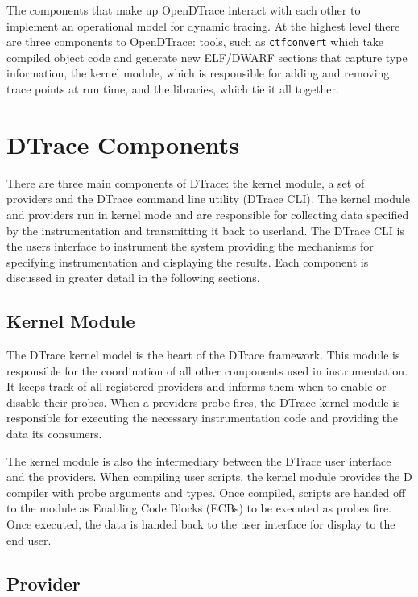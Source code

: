 The components that make up OpenDTrace interact with each other to
implement an operational model for dynamic tracing.  At the highest
level there are three components to OpenDTrace: tools, such as
\texttt{ctfconvert} which take compiled object code and generate new
ELF/DWARF sections that capture type information, the kernel module,
which is responsible for adding and removing trace points at run time,
and the libraries, which tie it all together.

\section{DTrace Components}

There are three main components of DTrace: the kernel module, a set of
providers and the DTrace command line utility (DTrace CLI). The kernel
module and providers run in kernel mode and are responsible for
collecting data specified by the instrumentation and transmitting it
back to userland. The DTrace CLI is the users interface to instrument
the system providing the mechanisms for specifying instrumentation and
displaying the results. Each component is discussed in greater detail
in the following sections.

\subsection{Kernel Module}

The DTrace kernel model is the heart of the DTrace framework. This
module is responsible for the coordination of all other components
used in instrumentation. It keeps track of all registered providers
and informs them when to enable or disable their probes. When a
providers probe fires, the DTrace kernel module is responsible for
executing the necessary instrumentation code and providing the data
its consumers.

The kernel module is also the intermediary between the DTrace user
interface and the providers. When compiling user scripts, the kernel
module provides the D compiler with probe arguments and types. Once
compiled, scripts are handed off to the module as Enabling Code Blocks
(ECBs) to be executed as probes fire. Once executed, the data is
handed back to the user interface for display to the end user.

\subsection{Provider}

